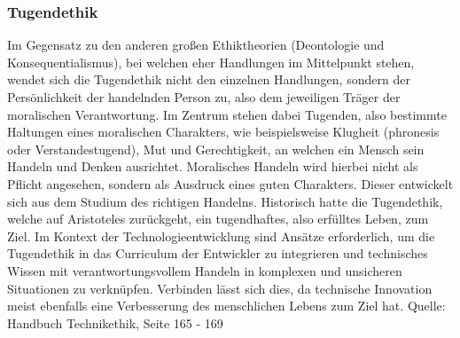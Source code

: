 \subsubsection{Tugendethik}
Im Gegensatz zu den anderen großen Ethiktheorien (Deontologie und Konsequentialismus), bei welchen eher Handlungen im Mittelpunkt stehen, wendet sich die Tugendethik nicht den einzelnen Handlungen, sondern der Persönlichkeit der handelnden Person zu, also dem jeweiligen Träger der moralischen Verantwortung. Im Zentrum stehen dabei Tugenden, also bestimmte Haltungen eines moralischen Charakters, wie beispielsweise Klugheit (phronesis oder Verstandestugend), Mut und Gerechtigkeit, an welchen ein Mensch sein Handeln und Denken ausrichtet. Moralisches Handeln wird hierbei nicht als Pflicht angesehen, sondern als Ausdruck eines guten Charakters. Dieser entwickelt sich aus dem Studium des richtigen Handelns. Historisch hatte die Tugendethik, welche auf Aristoteles zurückgeht, ein tugendhaftes, also erfülltes Leben, zum Ziel. Im Kontext der Technologieentwicklung sind Ansätze erforderlich, um die Tugendethik in das Curriculum der Entwickler zu integrieren und technisches Wissen mit verantwortungsvollem Handeln in komplexen und unsicheren Situationen zu verknüpfen. Verbinden lässt sich dies, da technische Innovation meist ebenfalls eine Verbesserung des menschlichen Lebens zum Ziel hat. \cite{}
Quelle: Handbuch Technikethik, Seite 165 - 169


